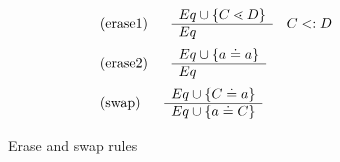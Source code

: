 \begin{figure}
\begin{align*}
&\begin{tabular}[t]{ll}
      (erase1)  & $ 
      \begin{array}[c]{ll}
        \begin{array}[c]{l}
          Eq \cup \set{C \lessdot D}\\
          \hline
          Eq
        \end{array}
        & C <: D
      \end{array}$\\
          \end{tabular}\\
&\begin{tabular}[t]{ll}
      (erase2)  & $ 
      \begin{array}[c]{ll}
        \begin{array}[c]{l}
          Eq \cup \set{a \doteq a}\\
          \hline
          Eq
        \end{array}
      \end{array}$\\
          \end{tabular}\\
    &      \begin{tabular}[t]{ll}
       (swap) & $
            \begin{array}[c]{ll}
              \begin{array}[c]{l}
                Eq \cup \set{C \doteq a}\\
                \hline
                Eq \cup \set{a \doteq C}
              \end{array}
            \end{array}$
          \end{tabular}
\end{align*}
\caption{Erase and swap rules}\label{fig:fgjerase-rules}
\end{figure}